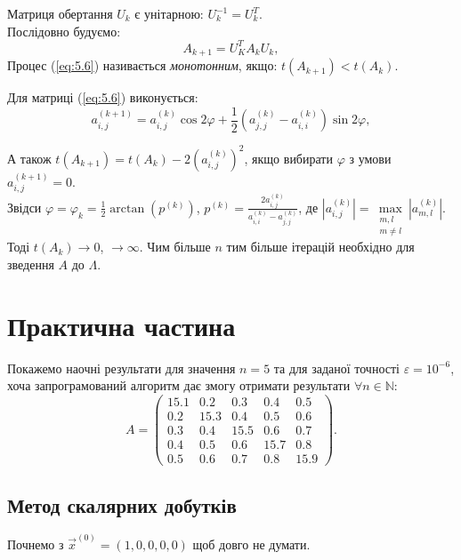 \documentclass[12pt, a4paper]{article}
\theoremstyle{definition}
\newcommand{\NN}{\mathbb{N}}
\newcommand{\Max}{\displaystyle\max\limits}
\renewcommand{\epsilon}{\varepsilon}
\renewcommand{\phi}{\varphi}
\numberwithin{equation}{section}
\begin{document}
Матриця обертання $U_k$ є унітарною: $U_k^{-1} = U_k^T$. \\

Послідовно будуємо:
\begin{equation}
	\label{eq:5.6}
	A_{k+1} = U_K^T A_k U_k,
\end{equation}
Процес (\ref{eq:5.6}) називається \textit{монотонним}, якщо: $t(A_{k+1})<t(A_k)$.

Для матриці (\ref{eq:5.6}) виконується:
\begin{equation}
	\label{eq:5.7}
	a_{i,j}^{(k+1)} = a_{i,j}^{(k)} \cos 2 \phi + \dfrac12 (a_{j,j}^{(k)} - a_{i,i}^{(k)}) \sin 2 \phi,
\end{equation}

А також $t(A_{k+1})=t(A_k)-2(a_{i,j}^{(k)})^2$, якщо вибирати $\phi$ з умови $a_{i,j}^{(k+1)} = 0$. \\

Звідси $\phi = \phi_k = \frac12 \arctan(p^{(k)})$, $p^{(k)} = \frac{2a_{i,j}^{(k)}}{a_{i,i}^{(k)}-a_{j,j}^{(k)}}$, де $|a_{i,j}^{(k)}| = \Max_{\substack{m,l \\ m \ne l}} |a_{m,l}^{(k)}|$. Тоді
$t(A_k) \to 0$, $\to \infty$. Чим більше $n$ тим більше ітерацій необхідно для зведення $A$ до $\Lambda$. 

\section{Практична частина}

Покажемо наочні результати для значення $n = 5$ та для заданої точності $\epsilon = 10^{-6}$, хоча запрограмований алгоритм дає змогу отримати результати $\forall n \in \NN$:
\[ A = \begin{pmatrix} 15.1 & 0.2 & 0.3 & 0.4 & 0.5 \\ 0.2 & 15.3 & 0.4 & 0.5 & 0.6 \\ 0.3 & 0.4 & 15.5 & 0.6 & 0.7 \\ 0.4 & 0.5 & 0.6 & 15.7 & 0.8 \\ 0.5 & 0.6 & 0.7 & 0.8 & 15.9 \end{pmatrix}. \]

\subsection{Метод скалярних добутків}

Почнемо з $\vec x^{(0)} = (1, 0, 0, 0, 0)$ щоб довго не думати.
\end{document}
